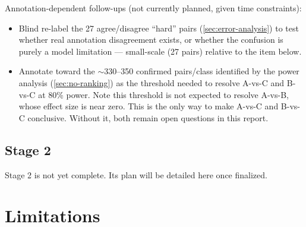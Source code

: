 Annotation-dependent follow-ups (not currently planned, given time
constraints):

\begin{itemize}
\item Blind re-label the 27 agree/disagree ``hard'' pairs
      (\autoref{sec:error-analysis}) to test whether real annotation
      disagreement exists, or whether the confusion is purely a model
      limitation --- small-scale (27 pairs) relative to the item below.
\item Annotate toward the $\sim$330--350 confirmed pairs/class identified by
      the power analysis (\autoref{sec:no-ranking}) as the threshold
      needed to resolve A-vs-C and B-vs-C at 80\% power. Note this
      threshold is not expected to resolve A-vs-B, whose effect size is
      near zero. This is the only way to make A-vs-C and B-vs-C
      conclusive. Without it, both remain open questions in this report.
\end{itemize}

\section{Stage 2}

Stage 2 is not yet complete. Its plan will be detailed here once finalized.


\chapter{Limitations}
\label{c:limitations}

